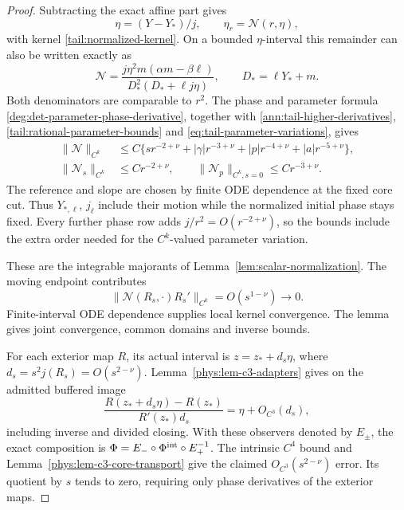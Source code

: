 \begin{proof}
Subtracting the exact affine part gives
\begin{equation}\label{eq:normalized-difference}
 \eta=(Y-Y_*)/j,\qquad \eta_r=\mathcal N(r,\eta),
\end{equation}
with kernel \eqref{tail:normalized-kernel}. On a bounded
\(\eta\)-interval this remainder can also be written exactly as
\begin{equation}\label{tail:exact-affine-remainder}
 \mathcal N=
 \frac{j\eta^2 m(\alpha m-\beta\ell)}
 {D_*^2(D_*+\ell j\eta)},\qquad D_*=\ell Y_*+m.
\end{equation}
Both denominators are comparable to \(r^2\). The phase and parameter
formula \eqref{deg:det-parameter-phase-derivative}, together with
\eqref{ann:tail-higher-derivatives},
\eqref{tail:rational-parameter-bounds} and
\eqref{eq:tail-parameter-variations}, gives
\begin{align}
 \|\mathcal N\|_{C^k}
 &\le C\{sr^{-2+\nu}+|\gamma|r^{-3+\nu}
                       +|p|r^{-4+\nu}+|a|r^{-5+\nu}\},\label{eq:N-bound}\\
 \|\mathcal N_s\|_{C^k}&\le Cr^{-2+\nu},\qquad
 \|\mathcal N_p\|_{C^k,s=0}\le Cr^{-3+\nu}.
 \label{eq:N-parameter-bound}
\end{align}
The reference and slope are chosen by finite ODE dependence at the fixed
core cut. Thus \(Y_{*,\ell}\), \(j_\ell\) include their motion while
the normalized initial phase stays fixed. Every further phase row adds
\(j/r^2=O(r^{-2+\nu})\), so the bounds include the extra order needed
for the \(C^k\)-valued parameter variation.

These are the integrable majorants of Lemma~\ref{lem:scalar-normalization}.
The moving endpoint contributes
\[
 \|\mathcal N(R_s,\cdot)R_s'\|_{C^k}=O(s^{1-\nu})\longrightarrow0 .
\]
Finite-interval ODE dependence supplies local kernel convergence.
The lemma gives joint convergence, common domains and inverse bounds.

For each exterior map \(R\), its actual interval is
\(z=z_*+d_s\eta\), where \(d_s=s^2j(R_s)=O(s^{2-\nu})\).
Lemma~\ref{phys:lem-c3-adapters} gives on the admitted buffered image
\begin{equation}\label{eq:exterior-normalization}
 \frac{R(z_*+d_s\eta)-R(z_*)}{R'(z_*)d_s}
                  =\eta+O_{C^3}(d_s),
\end{equation}
including inverse and divided closing. With these observers denoted by
\(E_\pm\), the exact composition is
\(\Phi=E_-\circ\Phi^{\rm int}\circ E_+^{-1}\). The intrinsic
\(C^4\) bound and Lemma~\ref{phys:lem-c3-core-transport} give the
claimed \(O_{C^3}(s^{2-\nu})\) error. Its quotient by \(s\) tends to
zero, requiring only phase derivatives of the exterior maps.


\end{proof}
